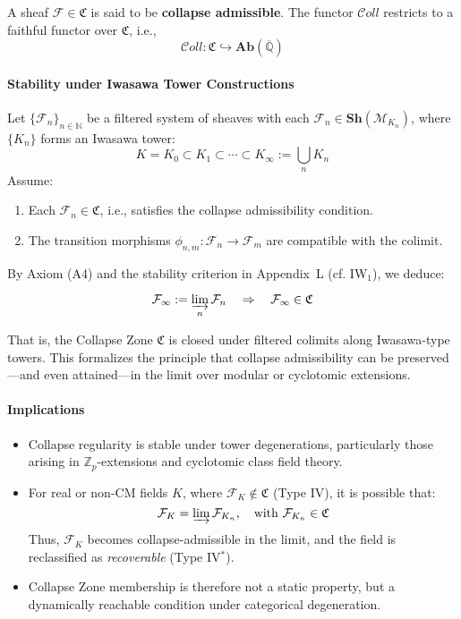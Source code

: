\documentclass[11pt]{article}
\begin{document}
A sheaf \( \mathcal{F} \in \mathfrak{C} \) is said to be \textbf{collapse admissible}. The functor \( \mathcal{C}oll \) restricts to a faithful functor over \( \mathfrak{C} \), i.e.,
\[
\mathcal{C}oll : \mathfrak{C} \hookrightarrow \mathbf{Ab}(\overline{\mathbb{Q}})
\]

\medskip

\paragraph{Stability under Iwasawa Tower Constructions}

Let \( \{ \mathcal{F}_n \}_{n \in \mathbb{N}} \) be a filtered system of sheaves with each \( \mathcal{F}_n \in \mathbf{Sh}(\mathcal{M}_{K_n}) \), where \( \{ K_n \} \) forms an Iwasawa tower:
\[
K = K_0 \subset K_1 \subset \cdots \subset K_\infty := \bigcup_{n} K_n
\]
Assume:
\begin{enumerate}
    \item Each \( \mathcal{F}_n \in \mathfrak{C} \), i.e., satisfies the collapse admissibility condition.
    \item The transition morphisms \( \phi_{n,m} : \mathcal{F}_n \to \mathcal{F}_m \) are compatible with the colimit.
\end{enumerate}

By Axiom (A4) and the stability criterion in Appendix~L (cf. IW$_1$), we deduce:

\begin{equation}
\label{eq:collapse-zone-stability}
\mathcal{F}_\infty := \varinjlim_{n} \mathcal{F}_n \quad \Rightarrow \quad \mathcal{F}_\infty \in \mathfrak{C}
\end{equation}

That is, the Collapse Zone \( \mathfrak{C} \) is closed under filtered colimits along Iwasawa-type towers.  
This formalizes the principle that collapse admissibility can be preserved—and even attained—in the limit over modular or cyclotomic extensions.

\medskip

\paragraph{Implications}

\begin{itemize}
    \item Collapse regularity is stable under tower degenerations, particularly those arising in \( \mathbb{Z}_p \)-extensions and cyclotomic class field theory.
    \item For real or non-CM fields \( K \), where \( \mathcal{F}_K \notin \mathfrak{C} \) (Type IV), it is possible that:
    \[
    \mathcal{F}_K = \varinjlim \mathcal{F}_{K_n}, \quad \text{with } \mathcal{F}_{K_n} \in \mathfrak{C}
    \]
    Thus, \( \mathcal{F}_K \) becomes collapse-admissible in the limit, and the field is reclassified as \emph{recoverable} (Type IV$^\ast$).
    \item Collapse Zone membership is therefore not a static property, but a dynamically reachable condition under categorical degeneration.
\end{itemize}
\end{document}
